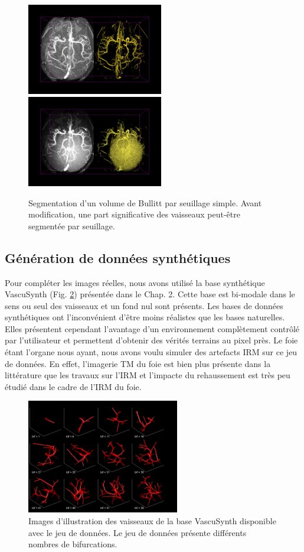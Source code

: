 \begin{figure}[h]
  \centering
  \includegraphics[height=4cm]{Images/threshold_bullitt.png}
  \includegraphics[height=4cm]{Images/threshold_bullitt_difficult.png}
  \caption{Segmentation d'un volume de Bullitt par seuillage simple. Avant modification, une part significative des vaisseaux peut-être segmentée par seuillage.}
  \label{fig:modifications_bullitt}
\end{figure}

\subsection{Génération de données synthétiques}

Pour compléter les images réelles, nous avons utilisé la base synthétique VascuSynth (Fig. \ref{fig:snap_vascu}) présentée dans le Chap. 2. Cette base est bi-modale dans le sens ou seul des vaisseaux et un fond nul sont présents. Les bases de données synthétiques ont l'inconvénient d'être moins réalistes que les bases naturelles. Elles présentent cependant l'avantage d'un environnement complètement contrôlé par l'utilisateur et permettent d'obtenir des vérités terrains au pixel près. Le foie étant l'organe nous ayant, nous avons voulu simuler des artefacts IRM sur ce jeu de données. En effet, l'imagerie TM du foie est bien plus présente dans la littérature que les travaux sur l'IRM et l'impacte du rehaussement est très peu étudié dans le cadre de l'IRM du foie.

\begin{figure}[h]
  \centering
  \includegraphics[height=5cm]{Images/snapVascu.png}
  
  \caption{Images d'illustration des vaisseaux de la base VascuSynth disponible avec le jeu de données. Le jeu de données présente différents nombres de bifurcations.}
  \label{fig:snap_vascu}
\end{figure}

